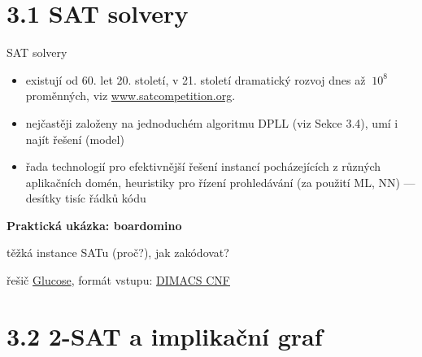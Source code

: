 \documentclass{beamer}
\begin{document}
\section{3.1 SAT solvery}


\begin{frame}{SAT solvery}

    \begin{itemize}
        \item existují od 60. let 20. století, v 21. století dramatický rozvoj dnes až $~10^8$ proměnných, viz \href{http://www.satcompetition.org}{\alert{www.satcompetition.org}}.
        \item nejčastěji založeny na jednoduchém \alert{algoritmu DPLL} (viz Sekce 3.4), umí i najít řešení (model)
        \item řada technologií pro efektivnější řešení instancí pocházejících z různých aplikačních domén, heuristiky pro řízení prohledávání (za použití ML, NN) --- desítky tisíc řádků kódu
    \end{itemize}
    
    \textbf{Praktická ukázka: boardomino}

    \smallskip


    \smallskip

    těžká instance SATu (proč?), jak zakódovat? 
    
    řešič \href{http://www.labri.fr/perso/lsimon/glucose/}{\alert{Glucose}}, formát vstupu: \href{http://people.sc.fsu.edu/~jburkardt/data/cnf/cnf.html}{\alert{DIMACS CNF}}
    
\end{frame}


\section{3.2 2-SAT a implikační graf}
\end{document}
